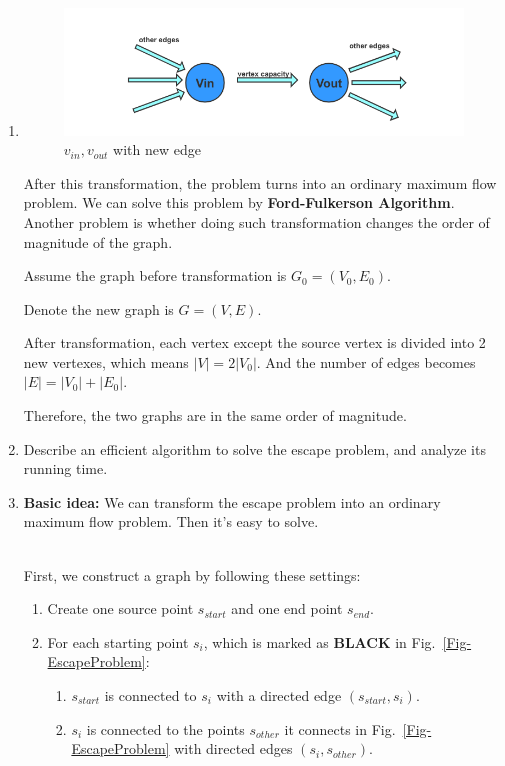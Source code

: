\documentclass[12pt,a4paper]{article}
\makeatletter
\newtheorem*{solution}{Solution}
\theoremstyle{definition}
\renewenvironment{solution}[1][Solution] {\par\pushQED{\qed}\normalfont\topsep6\p@\@plus6\p@\relax\trivlist\item[\hskip\labelsep\bfseries#1\@addpunct{.}]\ignorespaces}{\popQED\endtrivlist\@endpefalse} \makeatother
\makeatother
\begin{document}
\begin{enumerate}
\begin{enumerate}
\begin{solution}
        \begin{figure}[H]
            \centering
            \includegraphics[width=15cm]{1.png}
            \caption{$v_{in},v_{out}$ with new edge}
            \label{capcity vertex}
        \end{figure}
        
        After this transformation, the problem turns into an ordinary maximum flow problem. We can solve this problem by \textbf{Ford-Fulkerson Algorithm}.
    ~\\
    
    Another problem is whether doing such transformation changes the order of magnitude of the graph.
    
    Assume the graph before transformation is $G_0=(V_0,E_0)$. 
    
    Denote the new graph is $G=(V,E)$.
    
    
    After transformation, each vertex except the source vertex is divided into 2 new vertexes, which means $|V|=2|V_0|$. And the number of edges becomes $|E|=|V_0|+|E_0|$.
    
    Therefore, the two graphs are in the same order of magnitude.
    
    
        
        
        \end{solution}
        \item Describe an efficient algorithm to solve the escape problem, and analyze its running time.
        \begin{solution}
        \textbf{Basic idea:} We can transform the escape problem into an ordinary maximum flow problem. Then it's easy to solve.
        
        ~\\
        First, we construct a graph by following these settings:
        \begin{enumerate}
        \item Create one source point $s_{start}$ and one end point $s_{end}$.
        
            \item For each starting point $s_i$, which is marked as \textbf{BLACK} in Fig.~\ref{Fig-EscapeProblem}: 
            \begin{enumerate}
                \item 
           $s_{start}$ is connected to $s_i$ with a directed edge $(s_{start}, s_i)$.
           \item
            $s_i$ is connected to the points $s_{other}$ it connects in Fig.~\ref{Fig-EscapeProblem} with  directed edges $(s_i, s_{other})$.
            

\end{enumerate}
\end{enumerate}
\end{solution}
\end{enumerate}
\end{enumerate}
\end{document}

